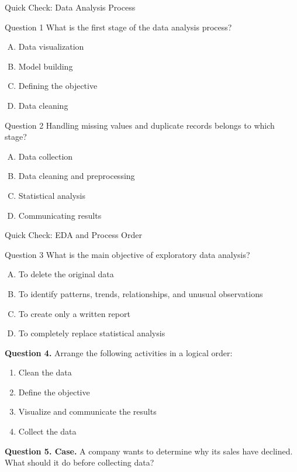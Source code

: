 \documentclass[aspectratio=169,11pt]{beamer}
\newcommand{\quiztitle}[1]{\textbf{\textcolor{QuizOrange}{#1}}}
\begin{document}
\begin{frame}{Quick Check: Data Analysis Process}
\begin{alertblock}{Question 1}
What is the first stage of the data analysis process?
\end{alertblock}
\begin{enumerate}[A.]
  \item Data visualization
  \item Model building
  \item Defining the objective
  \item Data cleaning
\end{enumerate}
\begin{alertblock}{Question 2}
Handling missing values and duplicate records belongs to which stage?
\end{alertblock}
\begin{enumerate}[A.]
  \item Data collection
  \item Data cleaning and preprocessing
  \item Statistical analysis
  \item Communicating results
\end{enumerate}
\end{frame}

\begin{frame}{Quick Check: EDA and Process Order}
\begin{alertblock}{Question 3}
What is the main objective of exploratory data analysis?
\end{alertblock}
\begin{enumerate}[A.]
  \item To delete the original data
  \item To identify patterns, trends, relationships, and unusual observations
  \item To create only a written report
  \item To completely replace statistical analysis
\end{enumerate}
\vspace{0.3em}
\quiztitle{Question 4.} Arrange the following activities in a logical order:
\begin{enumerate}
  \item Clean the data
  \item Define the objective
  \item Visualize and communicate the results
  \item Collect the data
\end{enumerate}
\quiztitle{Question 5. Case.} A company wants to determine why its sales have declined. What should it do before collecting data?
\end{frame}
\end{document}
